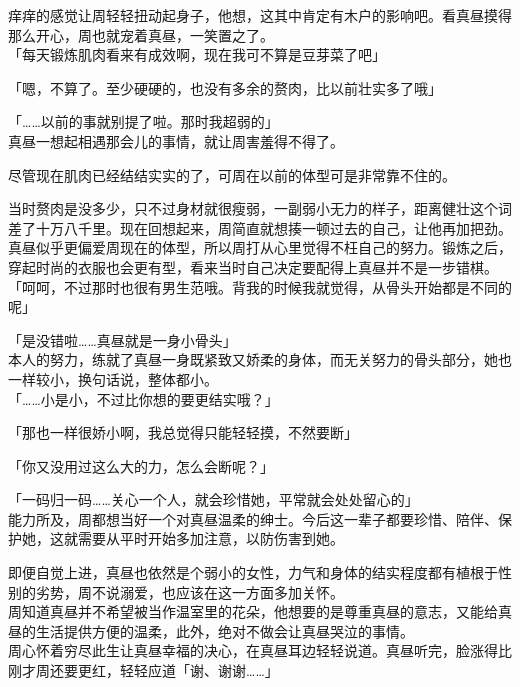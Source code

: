 痒痒的感觉让周轻轻扭动起身子，他想，这其中肯定有木户的影响吧。看真昼摸得那么开心，周也就宠着真昼，一笑置之了。\\

「每天锻炼肌肉看来有成效啊，现在我可不算是豆芽菜了吧」

「嗯，不算了。至少硬硬的，也没有多余的赘肉，比以前壮实多了哦」

「……以前的事就别提了啦。那时我超弱的」\\

真昼一想起相遇那会儿的事情，就让周害羞得不得了。

尽管现在肌肉已经结结实实的了，可周在以前的体型可是非常靠不住的。

当时赘肉是没多少，只不过身材就很瘦弱，一副弱小无力的样子，距离健壮这个词差了十万八千里。现在回想起来，周简直就想揍一顿过去的自己，让他再加把劲。\\

真昼似乎更偏爱周现在的体型，所以周打从心里觉得不枉自己的努力。锻炼之后，穿起时尚的衣服也会更有型，看来当时自己决定要配得上真昼并不是一步错棋。\\

「呵呵，不过那时也很有男生范哦。背我的时候我就觉得，从骨头开始都是不同的呢」

「是没错啦……真昼就是一身小骨头」\\

本人的努力，练就了真昼一身既紧致又娇柔的身体，而无关努力的骨头部分，她也一样较小，换句话说，整体都小。\\

「……小是小，不过比你想的要更结实哦？」

「那也一样很娇小啊，我总觉得只能轻轻摸，不然要断」

「你又没用过这么大的力，怎么会断呢？」

「一码归一码……关心一个人，就会珍惜她，平常就会处处留心的」\\

能力所及，周都想当好一个对真昼温柔的绅士。今后这一辈子都要珍惜、陪伴、保护她，这就需要从平时开始多加注意，以防伤害到她。

即便自觉上进，真昼也依然是个弱小的女性，力气和身体的结实程度都有植根于性别的劣势，周不说溺爱，也应该在这一方面多加关怀。\\

周知道真昼并不希望被当作温室里的花朵，他想要的是尊重真昼的意志，又能给真昼的生活提供方便的温柔，此外，绝对不做会让真昼哭泣的事情。\\

周心怀着穷尽此生让真昼幸福的决心，在真昼耳边轻轻说道。真昼听完，脸涨得比刚才周还要更红，轻轻应道「谢、谢谢……」\\

